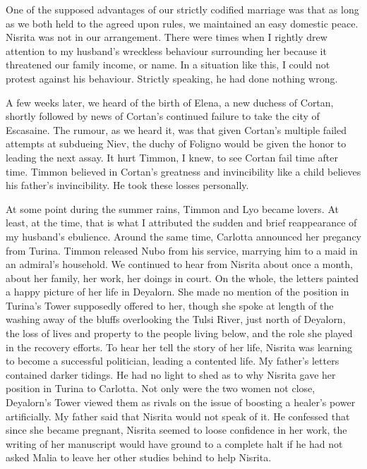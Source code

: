 \documentclass{article}
\begin{document}
One of the supposed advantages of our strictly codified marriage was that as long as we both held to the agreed upon rules, we maintained an easy domestic peace. Nisrita was not in our arrangement. There were times when I rightly drew attention to my husband's wreckless behaviour surrounding her because it threatened our family income, or name. In a situation like this, I could not protest against his behaviour. Strictly speaking, he had done nothing wrong. 

A few weeks later, we heard of the birth of Elena, a new duchess of Cortan, shortly followed by news of Cortan's continued failure to take the city of Escasaine. The rumour, as we heard it, was that given Cortan's multiple failed attempts at subdueing Niev, the duchy of Foligno would be given the honor to leading the next assay. It hurt Timmon, I knew, to see Cortan fail time after time. Timmon believed in Cortan's greatness and invincibility like a child believes his father's invincibility. He took these losses personally.

At some point during the summer rains, Timmon and Lyo became lovers. At least, at the time, that is what I attributed the sudden and brief reappearance of my husband's ebulience. Around the same time, Carlotta announced her pregancy from Turina. Timmon released Nubo from his service, marrying him to a maid in an admiral's household. We continued to hear from Nisrita about once a month, about her family, her work, her doings in court. On the whole, the letters painted a happy picture of her life in Deyalorn. She made no mention of the position in Turina's Tower supposedly offered to her, though she spoke at length of the washing away of the bluffs overlooking the Tulsi River, just north of Deyalorn, the loss of lives and property to the people living below, and the role she played in the recovery efforts. To hear her tell the story of her life, Nisrita was learning to become a successful politician, leading a contented life. My father's letters contained darker tidings. He had no light to shed as to why Nisrita gave her position in Turina to Carlotta. Not only were the two women not close, Deyalorn's Tower viewed them as rivals on the issue of boosting a healer's power artificially. My father said that Nisrita would not speak of it. He confessed that since she became pregnant, Nisrita seemed to loose confidence in her work, the writing of her manuscript would have ground to a complete halt if he had not asked Malia to leave her other studies behind to help Nisrita. 
\end{document}
